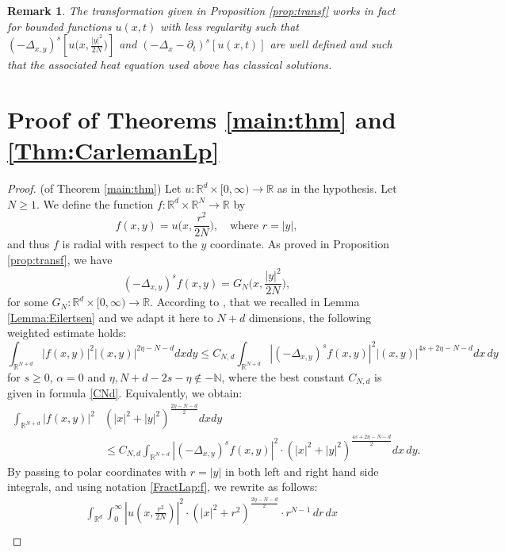 \documentclass[11pt, twoside, notitlepage]{amsart}
\newtheorem{remark}{Remark}
\newcommand\R{\mathbb{R}}
\newcommand\RN{\mathbb{R}^N}
\numberwithin{equation}{section}
\begin{document}
\begin{remark}
  The transformation given in Proposition \ref{prop:transf} works in fact for bounded  functions $u(x,t)$ with less regularity such that $(-\Delta_{x,y})^s \left[ u\big(x,\frac{|y|^2}{2N}\big)  \right]$  and  $ (-\Delta_x-\partial_t)^{s} [u(x,t)] $ are well defined and such that the associated heat equation used above has classical solutions.
\end{remark}

\section{Proof of Theorems \ref{main:thm} and \ref{Thm:CarlemanLp}}





\begin{proof}(of Theorem \ref{main:thm}) Let $u: \R^d \times [0,\infty) \to \R$ as in the hypothesis.  Let $N\ge 1$. We define the function  $f:\R^d \times \RN \to \R$  by
$$f(x,y)=u\big(x,\frac{r^2}{2N}\big) ,\quad \text{where } r=|y|,$$
and thus $f$ is radial with respect to the $y$ coordinate. As proved in Proposition \ref{prop:transf},   we have
\begin{equation*}%
(-\Delta_{x,y})^s f(x,y) =   G_N\big(x,  \frac{|y|^2}{2N}\big),
\end{equation*}
for some $G_N:\R^d \times [0,\infty)\to \R$.   According to \cite[Thm16]{EilertsenJFA2001}, that we recalled in Lemma \ref{Lemma:Eilertsen} and we adapt it here to $N+d$ dimensions, the following weighted estimate holds:
$$
 \int_{\R^{N+d}} |f(x,y)|^2 |(x,y)|^{2\eta - N-d} dx dy \le C_{N,d} \int_{\R^{N+d}} \left| (-\Delta_{x,y})^{s}  f(x,y)\right|^2  |(x,y)|^{ 4s +2\eta - N-d} dx\, dy
 $$
for $s \ge 0$, $\alpha=0$ and  $\eta, N+d-2s-\eta\not\in -\mathbb{N}$, where the best constant $C_{N,d}$ is given in formula \eqref{CNd}.
Equivalently, we obtain:
\begin{align*}
 \int_{\R^{N+d}} |f(x,y)|^2 & (|x|^2+|y|^2)^{\frac{{2\eta - N-d}}{2}} dx dy  \\
 & \le C_{N,d} \int_{\R^{N+d}} \left| (-\Delta_{x,y})^s  f(x,y)\right|^2  \cdot(|x|^2+|y|^2)^{\frac{ 4s +2\eta - N-d}{2}} dx \, dy.
  \end{align*}
    By passing to polar coordinates with $r= |y| $ in both left and right hand side integrals, and using notation \eqref{FractLap:f}, we rewrite as follows:
\begin{align*}
&\int_{\R^{d}}\int_0^\infty \left| u(x,\frac{r^2}{2N} ) \right|^2 \cdot \left(|x|^2+r^2\right)^{\frac{{2\eta - N-d}}{2}}\cdot r^{N-1}\, dr \, dx \\

\end{align*}
\end{proof}
\end{document}
